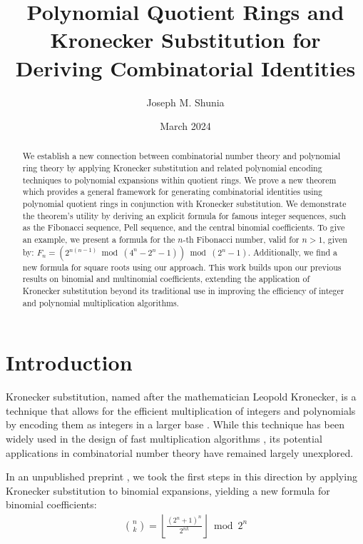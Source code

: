 \documentclass[12pt,reqno]{article}
\theoremstyle{plain}
\theoremstyle{definition}
\begin{document}
\title{Polynomial Quotient Rings and Kronecker Substitution for Deriving Combinatorial Identities}
\author{Joseph M. Shunia}
\date{March 2024}

\maketitle

\begin{abstract}
We establish a new connection between combinatorial number theory and polynomial ring theory by applying Kronecker substitution and related polynomial encoding techniques to polynomial expansions within quotient rings. We prove a new theorem which provides a general framework for generating combinatorial identities using polynomial quotient rings in conjunction with Kronecker substitution. We demonstrate the theorem's utility by deriving an explicit formula for famous integer sequences, such as the Fibonacci sequence, Pell sequence, and the central binomial coefficients. To give an example, we present a formula for the $n$-th Fibonacci number, valid for $n > 1$, given by: $F_n = (2^{n (n - 1)} \bmod{(4^n-2^n-1)}) \bmod{(2^n-1)}$. Additionally, we find a new formula for square roots using our approach. This work builds upon our previous results on binomial and multinomial coefficients, extending the application of Kronecker substitution beyond its traditional use in improving the efficiency of integer and polynomial multiplication algorithms.
\end{abstract}

\section{Introduction}
Kronecker substitution, named after the mathematician Leopold Kronecker, is a technique that allows for the efficient multiplication of integers and polynomials by encoding them as integers in a larger base \cite{kronecker1882}. While this technique has been widely used in the design of fast multiplication algorithms \cite{harvey2009kronecker, harvey2014faster, albrecht2018implementing, bos2020postquantum, greuet2022modular}, its potential applications in combinatorial number theory have remained largely unexplored.

In an unpublished preprint \cite{shunia2023simple}, we took the first steps in this direction by applying Kronecker substitution to binomial expansions, yielding a new formula for binomial coefficients:
\begin{align*}
    \binom{n}{k} = \left\lfloor \frac{(2^n+1)^n}{2^{n k}} \right\rfloor \bmod{2^n}
\end{align*}
\end{document}
